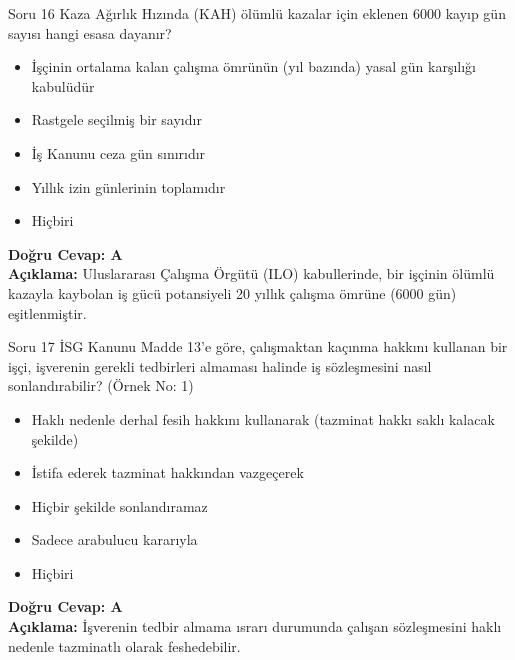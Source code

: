 \documentclass[12pt,a4paper]{article}
\begin{document}
\begin{testcard}{Soru 16}
    Kaza Ağırlık Hızında (KAH) ölümlü kazalar için eklenen 6000 kayıp gün sayısı hangi esasa dayanır?
    \begin{itemize}
        \item[A)] İşçinin ortalama kalan çalışma ömrünün (yıl bazında) yasal gün karşılığı kabulüdür
        \item[B)] Rastgele seçilmiş bir sayıdır
        \item[C)] İş Kanunu ceza gün sınırıdır
        \item[D)] Yıllık izin günlerinin toplamıdır
        \item[E)] Hiçbiri
    \end{itemize}
    \tcblower
    \textbf{Doğru Cevap: A} \\
    \textbf{Açıklama:} Uluslararası Çalışma Örgütü (ILO) kabullerinde, bir işçinin ölümlü kazayla kaybolan iş gücü potansiyeli 20 yıllık çalışma ömrüne (6000 gün) eşitlenmiştir.
\end{testcard}

\begin{testcard}{Soru 17}
    İSG Kanunu Madde 13'e göre, çalışmaktan kaçınma hakkını kullanan bir işçi, işverenin gerekli tedbirleri almaması halinde iş sözleşmesini nasıl sonlandırabilir? (Örnek No: 1)
    \begin{itemize}
        \item[A)] Haklı nedenle derhal fesih hakkını kullanarak (tazminat hakkı saklı kalacak şekilde)
        \item[B)] İstifa ederek tazminat hakkından vazgeçerek
        \item[C)] Hiçbir şekilde sonlandıramaz
        \item[D)] Sadece arabulucu kararıyla
        \item[E)] Hiçbiri
    \end{itemize}
    \tcblower
    \textbf{Doğru Cevap: A} \\
    \textbf{Açıklama:} İşverenin tedbir almama ısrarı durumunda çalışan sözleşmesini haklı nedenle tazminatlı olarak feshedebilir.
\end{testcard}
\end{document}
